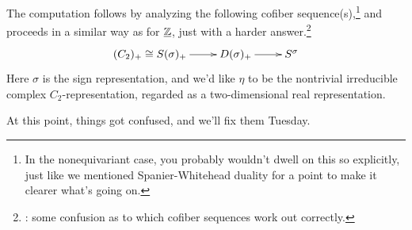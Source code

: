 The computation follows by analyzing the following cofiber sequence(s),\footnote{In the nonequivariant case, you
probably wouldn't dwell on this so explicitly, just like we mentioned Spanier-Whitehead duality for a point to make
it clearer what's going on.} and proceeds in a similar way as for $\underline{\mathbb Z}$, just with a harder
answer.\footnote{\TODO: some confusion as to which cofiber sequences work out correctly.}
\begin{gather}
\xymatrix{
	(C_2)_+\cong S(\sigma)_+\ar[r] & D(\sigma)_+\ar[r] & S^\sigma
}
\end{gather}
Here $\sigma$ is the sign representation, and we'd like $\eta$ to be the nontrivial irreducible complex
$C_2$-representation, regarded as a two-dimensional real representation.

At this point, things got confused, and we'll fix them Tuesday.

